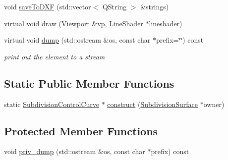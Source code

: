 \begin{DoxyCompactItemize}
\item 
void \hyperlink{classShipCAD_1_1SubdivisionControlCurve_a22726dc4edf385c5b4b5fead84d4c3de}{save\-To\-D\-X\-F} (std\-::vector$<$ Q\-String $>$ \&strings)
\item 
virtual void \hyperlink{classShipCAD_1_1SubdivisionControlCurve_a4d7d8e87dc582529e763039ffe593360}{draw} (\hyperlink{classShipCAD_1_1Viewport}{Viewport} \&vp, \hyperlink{classShipCAD_1_1LineShader}{Line\-Shader} $\ast$lineshader)
\item 
virtual void \hyperlink{classShipCAD_1_1SubdivisionControlCurve_a30e8d074583a386be2ab6343cb5f8502}{dump} (std\-::ostream \&os, const char $\ast$prefix=\char`\"{}\char`\"{}) const 
\begin{DoxyCompactList}\small\item\em print out the element to a stream \end{DoxyCompactList}\end{DoxyCompactItemize}
\subsection*{Static Public Member Functions}
\begin{DoxyCompactItemize}
\item 
static \hyperlink{classShipCAD_1_1SubdivisionControlCurve}{Subdivision\-Control\-Curve} $\ast$ \hyperlink{classShipCAD_1_1SubdivisionControlCurve_a21d9226cc2fd7efcaf6f1067912a0b34}{construct} (\hyperlink{classShipCAD_1_1SubdivisionSurface}{Subdivision\-Surface} $\ast$owner)
\end{DoxyCompactItemize}
\subsection*{Protected Member Functions}
\begin{DoxyCompactItemize}
\item 
void \hyperlink{classShipCAD_1_1SubdivisionControlCurve_a48fbb761e8c85120ba7f6876d873e898}{priv\-\_\-dump} (std\-::ostream \&os, const char $\ast$prefix) const 
\end{DoxyCompactItemize}
